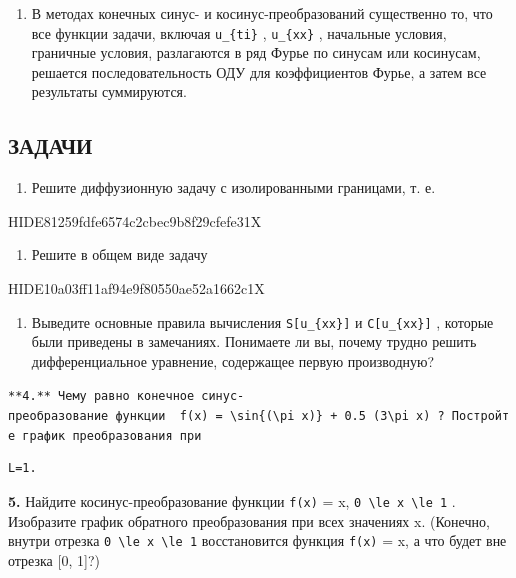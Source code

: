 \documentclass[
  ukrainian,
]{article}
\providecommand{\tightlist}{%
  \setlength{\itemsep}{0pt}\setlength{\parskip}{0pt}}
\begin{document}
\begin{enumerate}
\def\labelenumi{\arabic{enumi}.}
\setcounter{enumi}{2}
\tightlist
\item
  В методах конечных синус- и косинус-преобразований существенно то, что
  все функции задачи, включая \texttt{u\_\{ti\}} , \texttt{u\_\{xx\}} ,
  начальные условия, граничные условия, разлагаются в ряд Фурье по
  синусам или косинусам, решается последовательность ОДУ для
  коэффициентов Фурье, а затем все результаты суммируются.
\end{enumerate}

\subsection{ЗАДАЧИ}\label{ux437ux430ux434ux430ux447ux438-1}

\begin{enumerate}
\def\labelenumi{\arabic{enumi}.}
\tightlist
\item
  Решите диффузионную задачу с изолированными границами, т. е.
\end{enumerate}

HIDE81259fdfe6574c2cbec9b8f29cfefe31X

\begin{enumerate}
\def\labelenumi{\arabic{enumi}.}
\setcounter{enumi}{1}
\tightlist
\item
  Решите в общем виде задачу
\end{enumerate}

HIDE10a03ff11af94e9f80550ae52a1662c1X

\begin{enumerate}
\def\labelenumi{\arabic{enumi}.}
\setcounter{enumi}{2}
\tightlist
\item
  Выведите основные правила вычисления \texttt{S{[}u\_\{xx\}{]}} и
  \texttt{C{[}u\_\{xx\}{]}} , которые были приведены в замечаниях.
  Понимаете ли вы, почему трудно решить дифференциальное уравнение,
  содержащее первую производную?
\end{enumerate}

\texttt{**4.**\ Чему\ равно\ конечное\ синус-преобразование\ функции\ \ \textquotesingle{}f(x)\ =\ \textbackslash{}sin\{(\textbackslash{}pi\ x)\}\ +\ 0.5\ (3\textbackslash{}pi\ x)\textquotesingle{}\ ?\ Постройте\ график\ преобразования\ при}

\begin{verbatim}
L=1.
\end{verbatim}

\textbf{5.} Найдите косинус-преобразование функции \texttt{f(x)} = x,
\texttt{0\ \textbackslash{}le\ x\ \textbackslash{}le\ 1} . Изобразите
график обратного преобразования при всех значениях x. (Конечно, внутри
отрезка \texttt{0\ \textbackslash{}le\ x\ \textbackslash{}le\ 1}
восстановится функция \texttt{f(x)} = x, а что будет вне отрезка {[}0,
1{]}?)
\end{document}
